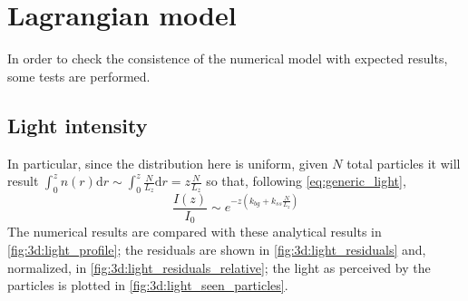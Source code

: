 \section{Lagrangian model}
In order to check the consistence of the numerical model with expected results, some tests are performed.



\subsection{Light intensity}
In particular, since the distribution here is uniform, given $N$ total particles it will result \( \int_0^z n(r) \mathrm{d}r \sim \int_0^z \frac{N}{L_z} \mathrm{d}r = z\frac{N}{L_z} \) so that, following \autoref{eq:generic_light},
\begin{equation} \label{eq:light_func}
    \frac{I(z)}{I_0} \sim e^{-z(k_{bg}+k_{ss}\frac{N}{L_z})} 
\end{equation}
The numerical results are compared with these analytical results in \autoref{fig:3d:light_profile}; the residuals are shown in \autoref{fig:3d:light_residuals} and, normalized, in \autoref{fig:3d:light_residuals_relative}; the light as perceived by the particles is plotted in \autoref{fig:3d:light_seen_particles}.

